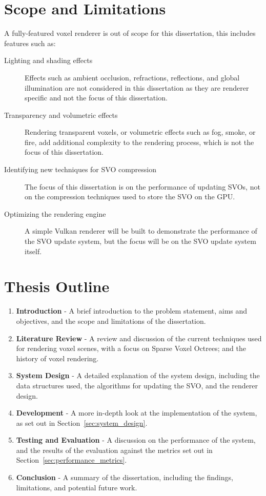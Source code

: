 \section{Scope and Limitations}
A fully-featured voxel renderer is out of scope for this dissertation, this includes features such as:

\begin{description}
    \item[Lighting and shading effects] Effects such as ambient occlusion, refractions, reflections, and global illumination
        are not considered in this dissertation as they are renderer specific and not the focus of this dissertation.
    \item[Transparency and volumetric effects] Rendering transparent voxels, or volumetric effects such as fog, smoke, or
        fire, add additional complexity to the rendering process, which is not the focus of this dissertation.
    \item[Identifying new techniques for SVO compression] The focus of this dissertation is on the performance of updating
        SVOs, not on the compression techniques used to store the SVO on the GPU.
    \item[Optimizing the rendering engine] A simple Vulkan renderer will be built to demonstrate the performance of the
        SVO update system, but the focus will be on the SVO update system itself.
\end{description}

\section{Thesis Outline}

\begin{enumerate}
    \item \textbf{Introduction} - A brief introduction to the problem statement, aims and objectives, and the scope and limitations
          of the dissertation.
    \item \textbf{Literature Review} - A review and discussion of the current techniques used for rendering voxel scenes,
          with a focus on Sparse Voxel Octrees; and the history of voxel rendering.
    \item \textbf{System Design} - A detailed explanation of the system design, including the data structures used, the
          algorithms for updating the SVO, and the renderer design.
    \item \textbf{Development} - A more in-depth look at the implementation of the system, as set out in Section~\ref{sec:system_design}.
    \item \textbf{Testing and Evaluation} - A discussion on the performance of the system, and the results of the evaluation
          against the metrics set out in Section~\ref{sec:performance_metrics}.
    \item \textbf{Conclusion} - A summary of the dissertation, including the findings, limitations, and potential future work.
\end{enumerate}